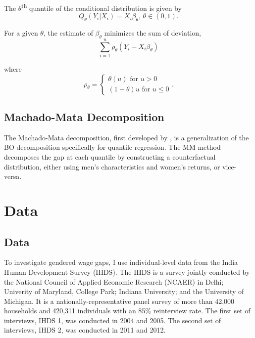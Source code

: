 \documentclass[12pt]{article}
\begin{document}
The $\theta$\textsuperscript{th} quantile of the conditional distribution is given by
\begin{equation}
	Q_{\theta}\left(Y_i|X_i \right) = X_{i}\beta_{\theta}, \, \theta \in (0, 1)
.\end{equation}

For a given $\theta$, the estimate of $\beta_{\theta}$ minimizes the sum of deviation,
\begin{equation}
	\sum_{i=1}^{n} \rho_{\theta} \left( Y_{i} - X_{i} \beta_{\theta} \right) 
\end{equation}

where
\begin{equation}
	\rho_{\theta} = \begin{cases}
		\theta\left(u \right)  \text{ for } u > 0 \\
		\left( 1-\theta \right) u \text{ for } u \leq 0
	\end{cases}
.\end{equation}


\subsection{Machado-Mata Decomposition
\label{subsec:m-m-decomposition}}

The Machado-Mata decomposition, first developed by \citet{MachadoMata2005}, is a generalization of the BO decomposition specifically for quantile regression. The MM method decomposes the gap at each quantile by constructing a counterfactual distribution, either using men's characteristics and women's returns, or vice-versa.

\section{Data
\label{sec:data}}

\subsection{Data}
To investigate gendered wage gaps, I use individual-level data from the India Human Development Survey (IHDS). The IHDS is a survey jointly conducted by the National Council of Applied Economic Research (NCAER) in Delhi; Univerity of Maryland, College Park; Indiana University; and the University of Michigan. It is a nationally-representative panel survey of more than 42,000 households and 420,311 individuals with an 85\% reinterview rate. The first set of interviews, IHDS 1, was conducted in 2004 and 2005. The second set of interviews, IHDS 2, was conducted in 2011 and 2012.
\end{document}
